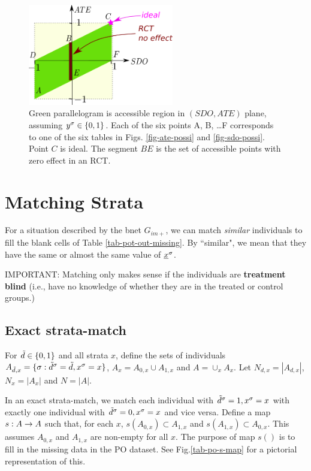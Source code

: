 \begin{figure}[h!]
\centering
\includegraphics[width=2.5in]
{pot-out/sdo-ate-polytope.png}
\caption{
Green parallelogram
is accessible region in
$(SDO,ATE)$ plane,
assuming $y^\sigma\in \{0,1\}$.
Each of the
six points A, B, \ldots F
corresponds to one of the six tables
in Figs. \ref{fig-ate-possi}
and \ref{fig-sdo-possi}.
Point $C$ is ideal.
The segment $BE$
is the set of 
accessible points 
with zero  effect in an RCT. 
} 
\label{fig-sdo-ate-polytope}
\end{figure}



\section{Matching Strata}

For a situation
described by
the bnet $G_{im+}$,
we can match {\it similar}
individuals to fill the blank cells of
 Table \ref{tab-pot-out-missing}.
By ``similar", we mean that
they have the same or almost the same
value of ${\underline{x}}^\sigma$.

IMPORTANT: Matching 
only makes sense 
if the individuals 
are {\bf treatment blind} (i.e., 
have no knowledge
of whether they are
in the treated or control
groups.)


\subsection{Exact strata-match}

For ${\tilde{d}}\in \{0,1\}$ and all strata $x$,
define the sets of individuals
$A_{{\tilde{d}},x}=\{\sigma: {\tilde{d}}^\sigma={\tilde{d}}, x^\sigma=x\}$,
$A_x=A_{0,x}\cup A_{1,x}$ and $A=\cup_x A_x$.
Let $N_{d,x}=|A_{d,x}|$,
$N_x= |A_x|$ and $N=|A|$.

In an exact strata-match,
we match each individual with
${\tilde{d}}^\sigma=1, x^\sigma=x$
with
exactly
one individual
with ${\tilde{d}}^\sigma=0, x^\sigma=x$
and vice versa.
Define a map $s:A\rightarrow A$
such that,
for each $x$,
$s(A_{0,x})\subset A_{1,x}$ and
$s(A_{1,x})\subset A_{0,x}$.
This assumes $A_{0,x}$ and $A_{1,x}$
are non-empty for all $x$.
The purpose of map $s()$
is
to fill in the missing data in the
PO dataset. See Fig.\ref{tab-po-s-map}
for a pictorial representation of 
this.

